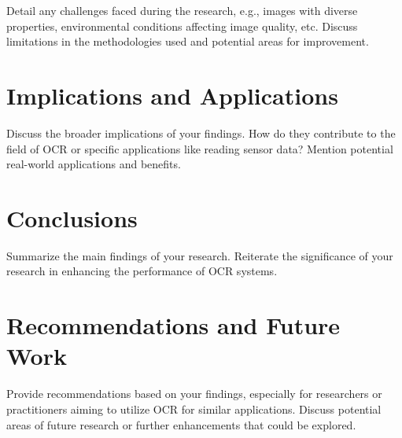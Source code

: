 Detail any challenges faced during the research, e.g., images with diverse properties, environmental conditions affecting image quality, etc.
Discuss limitations in the methodologies used and potential areas for improvement.


\section{Implications and Applications}

Discuss the broader implications of your findings. How do they contribute to the field of OCR or specific applications like reading sensor data?
Mention potential real-world applications and benefits.
\section{Conclusions}

Summarize the main findings of your research.
Reiterate the significance of your research in enhancing the performance of OCR systems.


\section{Recommendations and Future Work}

Provide recommendations based on your findings, especially for researchers or practitioners aiming to utilize OCR for similar applications.
Discuss potential areas of future research or further enhancements that could be explored.




